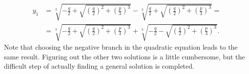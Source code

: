 \documentclass[english, parskip=full]{scrartcl}
\newcommand{\kla}{}
\begin{document}
\begin{align}
y_{1} &= \sqrt[3]{-\frac{q}{2} + \sqrt{\kla\left( \frac{q}{2} \right)^2 + \kla\left( \frac{p}{3} \right)^3}} - \sqrt[3]{\frac{q}{2} + \sqrt{\kla\left( \frac{q}{2} \right)^2 + \kla\left( \frac{p}{3} \right)^3}} = \\
&= \sqrt[3]{-\frac{q}{2} + \sqrt{\kla\left( \frac{q}{2} \right)^2 + \kla\left( \frac{p}{3} \right)^3}} + \sqrt[3]{-\frac{q}{2} - \sqrt{\kla\left( \frac{q}{2} \right)^2 + \kla\left( \frac{p}{3} \right)^3}}.
\end{align}
Note that choosing the negative branch in the quadratic equation leads to the same result.
Figuring out the other two solutions is a little cumbersome, but the difficult step of actually finding a general solution is completed.
\end{document}
